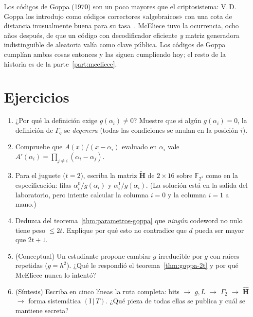 \documentclass[11pt,a4paper,oneside]{report}
\newcommand{\F}{\mathbb{F}}
\newcommand{\Hmat}{\mathbf{H}}          %
\newcommand{\FF}[1]{\F_{2^{#1}}}
\begin{document}
\begin{historia}
Los códigos de Goppa (1970) son un poco mayores que el criptosistema: V.\,D.
Goppa los introdujo como códigos correctores «algebraicos» con una cota de
distancia inusualmente buena para su tasa~\cite{goppa1970}. McEliece tuvo
la ocurrencia, ocho años después, de que un código con decodificador
eficiente \emph{y} matriz generadora indistinguible de aleatoria valía
como clave pública. Los códigos de Goppa cumplían ambas cosas entonces y
las siguen cumpliendo hoy; el resto de la historia es de la
parte~\ref{part:mceliece}.
\end{historia}

\section{Ejercicios}

\begin{enumerate}[leftmargin=1.6em,itemsep=2pt]
  \item ¿Por qué la definición exige $g(\alpha_i)\neq 0$? Muestre que si
        algún $g(\alpha_i)=0$, la definición de $\Gamma_q$ se
        \emph{degenera} (todas las condiciones se anulan en la posición
        $i$).
  \item Compruebe que $A(x)/(x-\alpha_i)$ evaluado en $\alpha_i$ vale
        $A'(\alpha_i)=\prod_{j\neq i}(\alpha_i-\alpha_j)$.
  \item Para el juguete ($t=2$), escriba la matriz $\tilde{\Hmat}$ de
        $2\times16$ sobre $\FF4$ como en la especificación: filas
        $\alpha_i^0/g(\alpha_i)$ y $\alpha_i^1/g(\alpha_i)$. (La solución
        está en la salida del laboratorio, pero intente calcular la
        columna $i=0$ y la columna $i=1$ a mano.)
  \item Deduzca del teorema~\ref{thm:parametros-goppa} que \emph{ningún}
        codeword no nulo tiene peso $\le 2t$. Explique por qué esto no
        contradice que $d$ pueda ser mayor que $2t+1$.
  \item \textnormal{(}Conceptual\textnormal{)} Un estudiante propone
        cambiar $g$ irreducible por $g$ con raíces repetidas
        ($g=h^2$). ¿Qué le respondió el teorema~\ref{thm:goppa-2t} y por
        qué McEliece nunca lo intentó?
  \item \textnormal{(}Síntesis\textnormal{)} Escriba en cinco líneas la
        ruta completa: bits $\to$ $g,L$ $\to$ $\Gamma_2$ $\to$ $\hat{\Hmat}$
        $\to$ forma sistemática $(\mathrm{I}\,|\,T)$. ¿Qué pieza de todas
        ellas se publica y cuál se mantiene secreta?
\end{enumerate}
\end{document}
